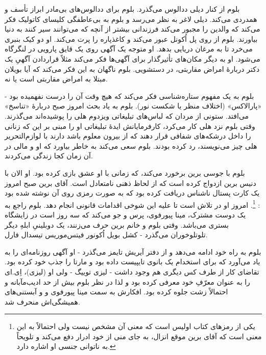 \documentclass[12pt]{book}
\begin{document}
    بلوم از کنار دیلی ددالوس می‌گذرد. بلوم برای ددالوس‌های بی‌مادر ابراز تأسف و همدردی می‌کند. دیلی لاغر به نظر می‌رسد و بلوم به بی‌عاطفگی کلیسای کاتولیک فکر می‌کند که والدین را مجبور می‌کند فرزندانی بیشتر از آنچه که می‌توانند سیر کنند به دنیا بیاورند. بلوم از روی پل اُکونل عبور می‌کند و کاغذپاره را پرت می‌کند. او دو کیک بنبری می‌خرد تا به مرغان دریایی بدهد. او متوجه یک آگهی روی یک قایق پارویی در لنگرگاه می‌شود. او به دیگر مکان‌های تأثیرگذار برای آگهی‌ها فکر می‌کند مثلاً قراردادن آگهیِ یک دکتر دربارۀ امراض مقاربتی، در دستشویی. بلوم ناگهان به این فکر می‌کند که آیا بویلان مبتلا به امراض مقاربتی است یا نه.

    بلوم به یک مفهوم ستاره‌شناسی فکر می‌کند که هیچ وقت آن را درست نفهمیده بود - «پارالاکس» (اختلاف منظر یا شکست نور). بلوم به یاد بحث امروز صبح دربارۀ «تناسخ» می‌افتد. ستونی از مردان که لباس‌های تبلیغاتی ویزدوم هلی را پوشیده‌اند می‌گذرند. وقتی بلوم نزد هلی کار می‌کرد، کارفرمایانش ایدۀ تبلیغاتی او را مبنی بر این که زنانی را داخل درشکه‌های شفافی قرار دهند که از بیرون معلوم باشد دارند با لوازم‌التحریر هلی چیز می‌نویسند، رد کرده بودند. بلوم سعی می‌کند به خاطر بیاورد که او و مالی در آن زمان کجا زندگی می‌کردند.

    بلوم با جوسی برین برخورد می‌کند، که زمانی با او عشق بازی کرده بود. او الان با دنیس برین ازدواج کرده است که از لحاظ ذهنی نامتعادل است. آقای برین صبح امروز یک کارت پستال ناشناس دریافت کرده بود که به صورت رمزی روی آن نوشته شده بود : \footnote{ یکی از رمزهای کتاب اولیس است که معنی آن مشخص نیست ولی احتمالاً به این معنی است که آقای برین موقع انزال، به جای منی از خود ادرار دفع می‌کند و تلویحاً به ناتوانی جنسی او اشاره دارد.}. امروز او در تلاش است تا علیه این شوخی اقدامات قانونی انجام دهد. بلوم راجع به یک دوست مشترک، مینا پیورفوی، پرس و جو می‌کند که سه روز است در زایشگاه بستری می‌باشد. وقتی بلوم و خانم برین حرف می‌زنند، یک دوبلینیِ ابلهِ دیگر تلوتلوخوران می‌گذرد - کشل بویل اُکونور فیتس‌موریس تیسدال فارل.

    بلوم به راه خود ادامه می‌دهد و از دفتر آیریش تایمز می‌گذرد - او آگهی روزنامه‌ای را به یاد می‌آورد که برای استخدام یک بانوی تایپیست داده بود و مارتا را جذب خود کرده بود. تقاضای کار از طرف کس دیگری هم وجود داشت - لیزی توییگ - ولی او (لیزی)، اِی.ای را به عنوان معرّفِ خود معرفی کرده بود و لذا در نظر بلوم بیش از حد ادیب‌مآبانه و احتمالاً زشت جلوه کرده بود. افکارش به سمت مینا پیورفوی و و آبستنی‌های همیشگی‌اش منحرف شد.
\end{document}
